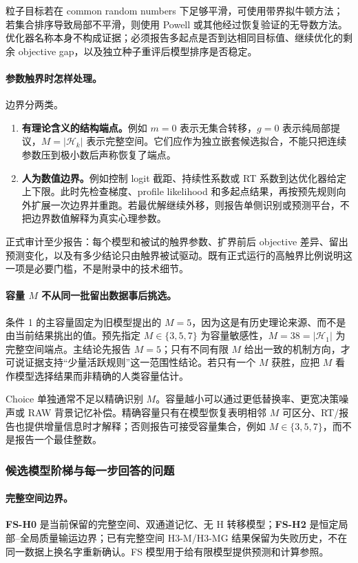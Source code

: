 粒子目标若在 common random numbers 下足够平滑，可使用带界拟牛顿方法；若集合排序导致局部不平滑，则使用 Powell 或其他经过恢复验证的无导数方法。优化器名称本身不构成证据；必须报告多起点是否到达相同目标值、继续优化的剩余 objective gap，以及独立种子重评后模型排序是否稳定。

\paragraph{参数触界时怎样处理。}
边界分两类。
\begin{enumerate}
    \item \textbf{有理论含义的结构端点。}例如 $m=0$ 表示无集合转移，$g=0$ 表示纯局部提议，$M=|\mathcal H_k|$ 表示完整空间。它们应作为独立嵌套候选拟合，不能只把连续参数压到极小数后声称恢复了端点。
    \item \textbf{人为数值边界。}例如控制 logit 截距、持续性系数或 RT 系数到达优化器给定上下限。此时先检查梯度、profile likelihood 和多起点结果，再按预先规则向外扩展一次边界并重跑。若最优解继续外移，则报告单侧识别或预测平台，不把边界数值解释为真实心理参数。
\end{enumerate}
正式审计至少报告：每个模型和被试的触界参数、扩界前后 objective 差异、留出预测变化，以及有多少结论只由触界被试驱动。既有正式运行的高触界比例说明这一项是必要门槛，不是附录中的技术细节。

\paragraph{容量 $M$ 不从同一批留出数据事后挑选。}
条件 1 的主容量固定为旧模型提出的 $M=5$，因为这是有历史理论来源、而不是由当前结果挑出的值。预先指定 $M\in\{3,5,7\}$ 为容量敏感性，$M=38=|\mathcal H_1|$ 为完整空间端点。主结论先报告 $M=5$；只有不同有限 $M$ 给出一致的机制方向，才可说证据支持“少量活跃规则”这一范围性结论。若只有一个 $M$ 获胜，应把 $M$ 看作模型选择结果而非精确的人类容量估计。

Choice 单独通常不足以精确识别 $M$。容量越小可以通过更低替换率、更宽决策噪声或 RAW 背景记忆补偿。精确容量只有在模型恢复表明相邻 $M$ 可区分、RT/报告也提供增量信息时才解释；否则报告可接受容量集合，例如 $M\in\{3,5,7\}$，而不是报告一个最佳整数。


\subsubsection{候选模型阶梯与每一步回答的问题}

\paragraph{完整空间边界。}
\textbf{FS-H0} 是当前保留的完整空间、双通道记忆、无 H 转移模型；\textbf{FS-H2} 是恒定局部--全局质量输运边界；已有完整空间 H3-M/H3-MG 结果保留为失败历史，不在同一数据上换名字重新确认。FS 模型用于给有限模型提供预测和计算参照。

